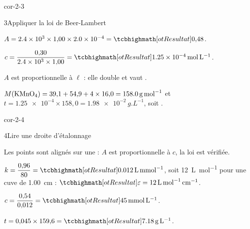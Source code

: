 \begin{blocLivre}{cor-2-3}
\begin{corrige}{3}{Appliquer la loi de Beer-Lambert}
\begin{questions}
\item $A=\num{2.4e3}\times1{,}00\times\num{2.0e-4}=\res{0{,}48}$.
\item $c=\dfrac{0{,}30}{\num{2.4e3}\times1{,}00}=\res{\qty{1,25e-4}{mol.L^{-1}}}$.
\item $A$ est proportionnelle à $\ell$ : elle double et vaut .
\item $M(\ce{KMnO4})=39{,}1+54{,}9+4\times16{,}0=\qty{158,0}{g.mol^{-1}}$ et $t=\num{1.25e-4}\times158{,}0=\qty{1,98e-2}{g.L^{-1}}$, soit .
\end{questions}
\end{corrige}
\end{blocLivre}
\begin{blocLivre}{cor-2-4}
\begin{corrige}{4}{Lire une droite d'étalonnage}
\begin{questions}
\item Les points sont alignés sur une  : $A$ est proportionnelle à $c$, la loi est vérifiée.
\item $k=\dfrac{0{,}96}{80}=\res{\qty{0,012}{L.mmol^{-1}}}$, soit \qty{12}{L.mol^{-1}} pour une cuve de \qty{1,00}{cm} : $\res{\varepsilon=\qty{12}{L.mol^{-1}.cm^{-1}}}$.
\item $c=\dfrac{0{,}54}{0{,}012}=\res{\qty{45}{mmol.L^{-1}}}$.
\item $t=0{,}045\times159{,}6=\res{\qty{7,18}{g.L^{-1}}}$.
\end{questions}
\end{corrige}
\end{blocLivre}
